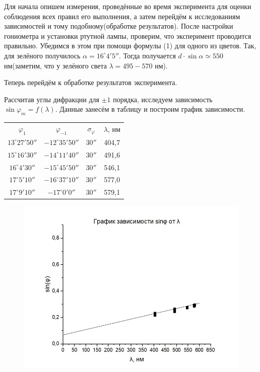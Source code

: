 \documentclass[a4paper,12pt]{article} %
\begin{document}
Для начала опишем измерения, проведённые во время эксперимента для оценки  соблюдения всех правил его выполнения, а затем перейдём к исследованиям зависимостей и тому подобному(обработке результатов).
После настройки гониометра и установки ртутной лампы, проверим, что эксперимент проводится правильно. Убедимся в этом при помощи формулы (1) для одного из цветов. Так, для зелёного получилось $\alpha = 16^\circ 4' 5''$. Тогда получается $d \cdot \sin \alpha \simeq 550$ нм(заметим, что у зелёного света $\lambda = 495-570$ нм).

Теперь перейдём к обработке результатов эксперимента.

Рассчитав углы дифракции для $\pm 1$ порядка, исследуем зависимость $\sin \varphi_m = f(\lambda)$. Данные занесём в таблицу и построим график зависимости. 

\begin{table}[H]
	\centering
	\begin{tabular}{c|c|c|c}
	$\varphi_1$ & $\varphi_{-1}$ & $\sigma_\varphi$ & $\lambda$, нм 	\\
	$13^\circ 27' 50''$ & $-12^\circ 35' 50''$ & $30''$ & 404,7 \\
	$15^\circ 16' 30''$ & $-14^\circ 11' 40''$ & $30''$ & 491,6 \\
	$16^\circ 4'  30''$ & $-15^\circ 45' 50''$ & $30''$ & 546,1 \\
	$17^\circ 5'  10''$ & $-16^\circ 37' 10''$ & $30''$ & 577,0 \\
	$17^\circ 9'  10''$ & $-17^\circ 0'  0''$  & $30''$ & 579,1 \\
	\end{tabular}
\end{table}

\begin{figure}[H]
    \centering
    \includegraphics[scale=0.8]{graph1}
\end{figure}
\end{document}
